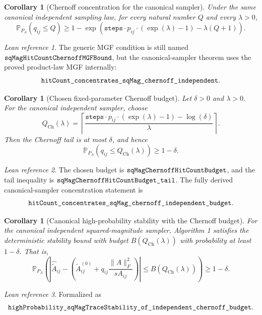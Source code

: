 \documentclass[11pt]{article}
\newcommand{\Frob}[1]{\lVert #1\rVert_F}
\newcommand{\Prob}{\mathbb{P}}
\newcommand{\lean}[1]{\texttt{\detokenize{#1}}}
\newtheorem{corollary}[theorem]{Corollary}
\theoremstyle{definition}
\theoremstyle{remark}
\newtheorem*{leanref}{Lean reference}
\begin{document}
\begin{corollary}[Chernoff concentration for the canonical sampler]
Under the same canonical independent sampling law, for every natural number
\(Q\) and every \(\lambda>0\),
\[
  \Prob_{P_A}(q_{ij}\le Q)
  \ge
  1 -
  \exp\left(
    \texttt{steps}\cdot p_{ij}\cdot(\exp(\lambda)-1)
    -\lambda(Q+1)
  \right).
\]
\end{corollary}

\begin{leanref}
The generic MGF condition is still named
\(\lean{sqMagHitCountChernoffMGFBound}\), but the canonical-sampler theorem
uses the proved product-law MGF internally:
\[
  \lean{hitCount_concentrates_sqMag_chernoff_independent}.
\]
\end{leanref}

\begin{corollary}[Chosen fixed-parameter Chernoff budget]
Let \(\delta>0\) and \(\lambda>0\). For the canonical independent sampler,
choose
\[
  Q_{\mathrm{Ch}}(\lambda)
  =
  \left\lceil
    \frac{
      \texttt{steps}\cdot p_{ij}\cdot(\exp(\lambda)-1)-\log(\delta)
    }{\lambda}
  \right\rceil.
\]
Then the Chernoff tail is at most \(\delta\), and hence
\[
  \Prob_{P_A}(q_{ij}\le Q_{\mathrm{Ch}}(\lambda)) \ge 1-\delta.
\]
\end{corollary}

\begin{leanref}
The chosen budget is \(\lean{sqMagChernoffHitCountBudget}\), and the tail
inequality is \(\lean{sqMagChernoffHitCountBudget_tail}\). The fully derived
canonical-sampler concentration statement is
\[
  \lean{hitCount_concentrates_sqMag_chernoff_independent_budget}.
\]
\end{leanref}

\begin{corollary}[Canonical high-probability stability with the Chernoff budget]
For the canonical independent squared-magnitude sampler, Algorithm 1 satisfies
the deterministic stability bound with budget \(B(Q_{\mathrm{Ch}}(\lambda))\)
with probability at least \(1-\delta\). That is,
\[
  \Prob_{P_A}\left(
    \left|
      \widehat{\widetilde A}_{ij}
      -
      \left(
        \widetilde A^{(0)}_{ij}
        +
        q_{ij}\frac{\Frob{A}^2}{s A_{ij}}
      \right)
    \right|
    \le B(Q_{\mathrm{Ch}}(\lambda))
  \right)
  \ge 1-\delta.
\]
\end{corollary}

\begin{leanref}
Formalized as
\[
  \lean{highProbability_sqMagTraceStability_of_independent_chernoff_budget}.
\]
\end{leanref}
\end{document}
